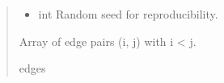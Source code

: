 \documentclass[letterpaper,10pt,english]{sphinxmanual}
\begin{document}
\begin{fulllineitems}
\begin{quote}
\begin{description}
\begin{itemize}
\item {} 
\sphinxAtStartPar
{} \textendash{} int
Random seed for reproducibility.

\end{itemize}

\sphinxAtStartPar
\begin{description}
\sphinxAtStartPar
Array of edge pairs (i, j) with i \textless{} j.

\end{description}


\sphinxAtStartPar
edges

\end{description}\end{quote}

\end{fulllineitems}

\end{document}
